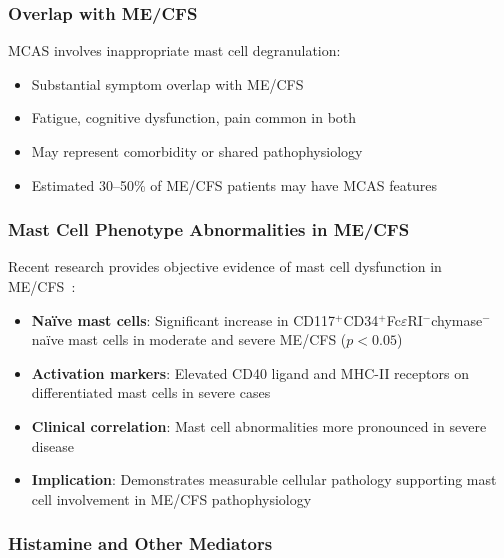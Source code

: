 \subsubsection{Overlap with ME/CFS}

MCAS involves inappropriate mast cell degranulation:
\begin{itemize}
    \item Substantial symptom overlap with ME/CFS
    \item Fatigue, cognitive dysfunction, pain common in both
    \item May represent comorbidity or shared pathophysiology
    \item Estimated 30--50\% of ME/CFS patients may have MCAS features~\cite{Wirth2023}
\end{itemize}

\subsubsection{Mast Cell Phenotype Abnormalities in ME/CFS}

Recent research provides objective evidence of mast cell dysfunction in ME/CFS~\cite{Hardcastle2016}:
\begin{itemize}
    \item \textbf{Naïve mast cells}: Significant increase in CD117$^+$CD34$^+$Fc$\varepsilon$RI$^-$chymase$^-$ naïve mast cells in moderate and severe ME/CFS ($p<0.05$)
    \item \textbf{Activation markers}: Elevated CD40 ligand and MHC-II receptors on differentiated mast cells in severe cases
    \item \textbf{Clinical correlation}: Mast cell abnormalities more pronounced in severe disease
    \item \textbf{Implication}: Demonstrates measurable cellular pathology supporting mast cell involvement in ME/CFS pathophysiology
\end{itemize}

\subsubsection{Histamine and Other Mediators}


